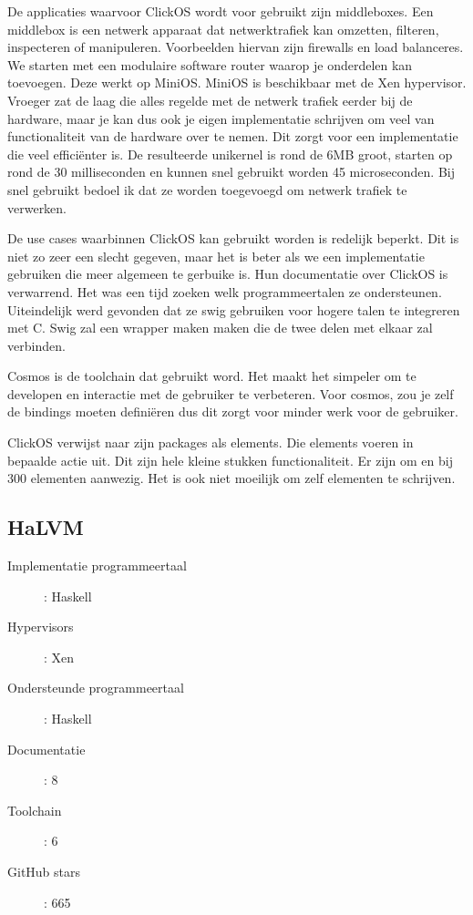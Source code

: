 \documentclass[pdftex,a4paper,12pt,twoside]{report}
\begin{document}
De applicaties waarvoor ClickOS wordt voor gebruikt zijn middleboxes. Een middlebox is een netwerk apparaat dat netwerktrafiek kan omzetten, filteren, inspecteren of manipuleren. Voorbeelden hiervan zijn firewalls en load balanceres.
We starten met een modulaire software router waarop je onderdelen kan toevoegen. Deze werkt op MiniOS. MiniOS is beschikbaar met de Xen hypervisor. Vroeger zat de laag die alles regelde met de netwerk trafiek eerder bij de hardware, maar je kan dus ook je eigen implementatie schrijven om veel van functionaliteit van de hardware over te nemen. Dit zorgt voor een implementatie die veel efficiënter is. De resulteerde unikernel is rond de 6MB groot, starten op rond de 30 milliseconden en kunnen snel gebruikt worden 45 microseconden. Bij snel gebruikt bedoel ik dat ze worden toegevoegd om netwerk trafiek te verwerken.

De use cases waarbinnen ClickOS kan gebruikt worden is redelijk beperkt. Dit is niet zo zeer een slecht gegeven, maar het is beter als we een implementatie gebruiken die meer algemeen te gerbuike is.
Hun documentatie over ClickOS is verwarrend. Het was een tijd zoeken welk programmeertalen ze ondersteunen.
Uiteindelijk werd gevonden dat ze swig gebruiken voor hogere talen te integreren met C. Swig zal een wrapper maken maken die de twee delen met elkaar zal verbinden.

Cosmos is de toolchain dat gebruikt word. Het maakt het simpeler om te developen en interactie met de gebruiker te verbeteren. Voor cosmos, zou je zelf de bindings moeten definiëren dus dit zorgt voor minder werk voor de gebruiker.

ClickOS verwijst naar zijn packages als elements. Die elements voeren in bepaalde actie uit. Dit zijn hele kleine stukken functionaliteit. Er zijn om en bij 300 elementen aanwezig. 
Het is ook niet moeilijk om zelf elementen te schrijven.

\subsection{HaLVM}

\begin{description}
  \item [Implementatie programmeertaal]: Haskell
  \item [Hypervisors]: Xen
  \item [Ondersteunde programmeertaal]: Haskell
  \item [Documentatie]: 8
  \item [Toolchain]: 6
  \item [GitHub stars]: 665
\end{description}
\end{document}
